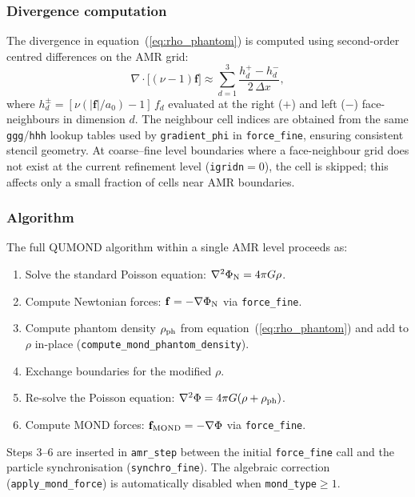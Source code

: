 \documentclass[fleqn,usenatbib]{mnras}
\newcommand{\code}[1]{\texttt{#1}}
\newcommand{\azero}{a_0}
\newcommand{\rhoph}{\rho_{\rm ph}}
\begin{document}
\subsubsection{Divergence computation}

The divergence in equation~(\ref{eq:rho_phantom}) is computed using
second-order centred differences on the AMR grid:
\begin{equation}
\nabla\cdot\bigl[(\nu-1)\mathbf{f}\bigr] \approx
\sum_{d=1}^{3} \frac{h_d^{+} - h_d^{-}}{2\,\Delta x},
\label{eq:div_fd}
\end{equation}
where $h_d^{\pm} = [\nu(|\mathbf{f}|/\azero) - 1]\,f_d$ evaluated at
the right ($+$) and left ($-$) face-neighbours in dimension $d$.  The
neighbour cell indices are obtained from the same \code{ggg}/\code{hhh}
lookup tables used by \code{gradient\_phi} in \code{force\_fine},
ensuring consistent stencil geometry.  At coarse--fine level boundaries
where a face-neighbour grid does not exist at the current refinement
level (\code{igridn}${}=0$), the cell is skipped; this affects only a
small fraction of cells near AMR boundaries.

\subsubsection{Algorithm}

The full QUMOND algorithm within a single AMR level proceeds as:
\begin{enumerate}
\item Solve the standard Poisson equation:
  $\nabla^2\Phi_{\rm N} = 4\pi G\rho$.
\item Compute Newtonian forces:
  $\mathbf{f} = -\nabla\Phi_{\rm N}$ via \code{force\_fine}.
\item Compute phantom density $\rhoph$ from equation~(\ref{eq:rho_phantom})
  and add to $\rho$ in-place (\code{compute\_mond\_phantom\_density}).
\item Exchange boundaries for the modified $\rho$.
\item Re-solve the Poisson equation:
  $\nabla^2\Phi = 4\pi G(\rho + \rhoph)$.
\item Compute MOND forces:
  $\mathbf{f}_{\rm MOND} = -\nabla\Phi$ via \code{force\_fine}.
\end{enumerate}
Steps 3--6 are inserted in \code{amr\_step} between the initial
\code{force\_fine} call and the particle synchronisation
(\code{synchro\_fine}).  The algebraic correction
(\code{apply\_mond\_force}) is automatically disabled when
\code{mond\_type}$\geq 1$.
\end{document}
